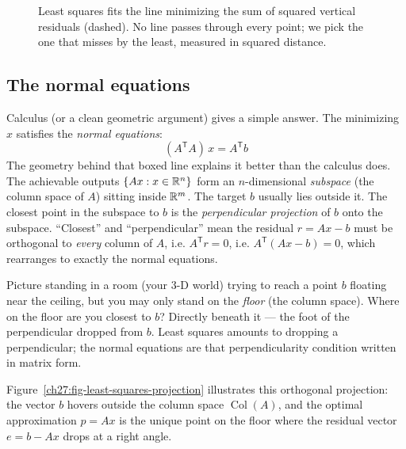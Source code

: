 \begin{figure}[h]
\centering
{}
\caption{Least squares fits the line minimizing the sum of squared vertical
residuals (dashed). No line passes through every point; we pick the one that
misses by the least, measured in squared distance.}
\label{ch27:least-squares}
\end{figure}

\subsection{The normal equations}

Calculus (or a clean geometric argument) gives a simple answer. The
minimizing $x$ satisfies the \emph{normal equations}:
$$
\boxed{\,(A^{\mathsf T}A)\,x=A^{\mathsf T}b\,}
$$
The geometry behind that boxed line explains it better than the
calculus does. The achievable outputs $\{Ax : x\in\mathbb{R}^n\}$ form an $n$-dimensional
\emph{subspace} (the column space of $A$) sitting inside $\mathbb{R}^m$. The target $b$
usually lies outside it. The closest point in the subspace to $b$ is the
\emph{perpendicular projection} of $b$ onto the subspace. ``Closest'' and
``perpendicular'' mean the residual $r=Ax-b$ must be orthogonal to \emph{every}
column of $A$, i.e. $A^{\mathsf T}r=0$, i.e. $A^{\mathsf T}(Ax-b)=0$, which
rearranges to exactly the normal equations.

\begin{intuitionbox}
Picture standing in a room (your $3$-D world) trying to reach a point $b$ floating
near the ceiling, but you may only stand on the \emph{floor} (the column space).
Where on the floor are you closest to $b$? Directly beneath it --- the foot of the
perpendicular dropped from $b$. Least squares amounts to dropping a perpendicular;
the normal equations are that perpendicularity condition written in
matrix form.
\end{intuitionbox}

Figure~\ref{ch27:fig-least-squares-projection} illustrates this orthogonal projection:
the vector $b$ hovers outside the column space $\operatorname{Col}(A)$, and the optimal
approximation $p = Ax$ is the unique point on the floor where the residual vector
$e = b - Ax$ drops at a right angle.


